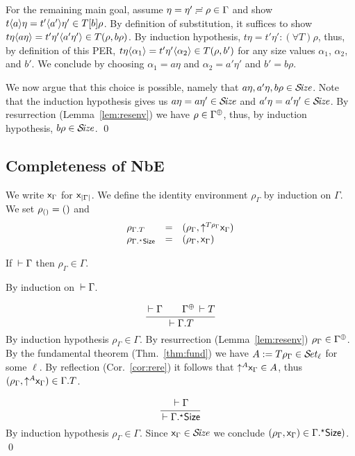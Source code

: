 \documentclass[acmlarge,review,anonymous]{acmart}\settopmatter{printfolios=true}
\makeatletter
\newenvironment{proof*}[1][\proofname]{\par
  \normalfont \topsep6\p@\@plus6\p@\relax
  \trivlist
  \item[\@proofindent\hskip\labelsep
        {\@proofnamefont #1\@addpunct{.}}]\ignorespaces
}{%
  \endtrivlist\@endpefalse
}
\makeatother
\begin{document}
{\begin{proof*}
\begin{caselist}
For the remaining main goal,
assume $\eta = \eta' \eeq \rho \in \Gamma$ and
show $t \ann a \eta = t' \ann{a'} \eta' \in T[b]\rho$.
By definition of substitution, it suffices to show
$t \eta \ann{a \eta} = t' \eta' \ann{a' \eta'} \in T(\rho, b \rho)$.
By induction hypothesis,
$t \eta = t' \eta' : (\forall T) \rho$, thus, by definition of this PER,
$t \eta \ann {\alpha_1} = t' \eta' \ann{\alpha_2} \in T(\rho, b')$ for any size values $\alpha_1$, $\alpha_2$, and $b'$.
We conclude by choosing $\alpha_1 = a \eta$ and $\alpha_2 = a' \eta'$ and $b' = b \rho$.

We now argue that this choice is possible,
namely that $a \eta, a'\eta, b\rho \in \SIZE$.
Note that the induction hypothesis gives us
$a \eta  = a  \eta' \in \SIZE$ and
$a' \eta = a' \eta' \in \SIZE$.
By resurrection (Lemma~\ref{lem:resenv}) we have $\rho \in \resurrect\Gamma$,
thus, by induction hypothesis, $b \rho \in \SIZE$.
\qed
\end{caselist}
\end{proof*}
} %

\subsection{Completeness of NbE}
\label{sec:compl}

We write $\var\Gamma$ for $\var{|\Gamma|}$.
We define the identity environment $\rho_\Gamma$ by induction on $\Gamma$.
We set $\rho_{\cempty} = \sempty$ and
\[
\begin{array}{lll}
  \rho_{\cext \Gamma T} & = & (\rho_\Gamma, \up{T\rho_\Gamma} \var\Gamma) \\
  \rho_{\eext \Gamma \Size} & = & (\rho_\Gamma, \var\Gamma) \\
\end{array}
\]
\begin{lemma}
  If\/ $\der \Gamma$ then
  $\rho_\Gamma \in \Gamma$.
\end{lemma}
\begin{proof*}
By induction on $\der \Gamma$.
\begin{caselist}

\nextcase
\[
  \ru{\der \Gamma \qquad \resurrect\Gamma \der T
    }{\der \cext\Gamma T}
\]
By induction hypothesis $\rho_\Gamma \in \Gamma$.
By resurrection (Lemma~\ref{lem:resenv}) $\rho_\Gamma \in \resurrect\Gamma$.
By the fundamental theorem (Thm.~\ref{thm:fund}) we have $A := T\rho_\Gamma \in \SET[\ell]$ for some $\ell$.
By reflection (Cor.~\ref{cor:rere}) it follows that $\up A \var\Gamma \in A$, thus
$(\rho_\Gamma, \up A \var\Gamma) \in \cext \Gamma T$.

\nextcase
\[
  \ru{\der \Gamma
    }{\der \eext\Gamma \Size}
\]
By induction hypothesis $\rho_\Gamma \in \Gamma$.  Since $\var\Gamma \in \SIZE$ we conclude
$(\rho_\Gamma, \var\Gamma) \in \eext\Gamma \Size)$.
\qed
\end{caselist}
\end{proof*}
\end{document}
